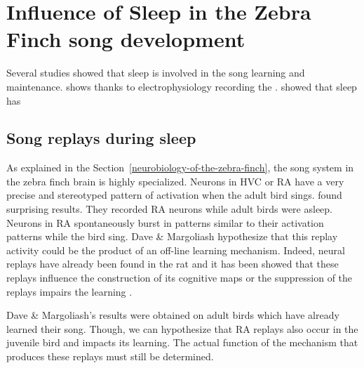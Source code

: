 \documentclass{report}
\begin{document}
\section{Influence of Sleep in the Zebra Finch song development}
\label{influence-of-sleep-in-the-zebra-finch-song-development}

Several studies showed that sleep is involved in the song learning and
maintenance. \textcite{dave_song_2000} shows thanks to electrophysiology
recording the . \textcite{deregnaucourt_how_2005} showed that sleep has \todo{}

\subsection{Song replays during sleep}
\label{song-replays-sleep}

As explained in the Section~\ref{neurobiology-of-the-zebra-finch}, the song
system in the zebra finch brain is highly specialized. Neurons in HVC or RA have
a very precise and stereotyped pattern of activation when the adult bird sings.
\textcite{dave_song_2000} found surprising results. They recorded RA neurons
while adult birds were asleep. Neurons in RA spontaneously burst in patterns
similar to their activation patterns while the bird sing. Dave \& Margoliash
hypothesize that this replay activity could be the product of an off-line
learning mechanism. Indeed, neural replays have already been found in the rat
and it has been showed that these replays influence the construction of its cognitive maps \parencite{de_lavilleon_explicit_2015} or the suppression of the replays impairs the learning \parencite{girardeau_selective_2009}.

Dave \& Margoliash's results were obtained on adult birds which have already
learned their song. Though, we can hypothesize that RA replays also occur in the
juvenile bird and impacts its learning. The actual function of the mechanism
that produces these replays must still be determined.
\end{document}
